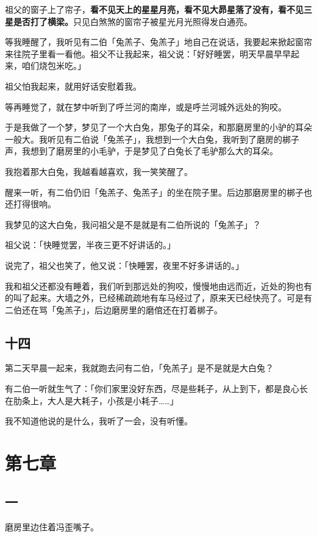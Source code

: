 \documentclass[UTF8]{ctexart}
\begin{document}
祖父的窗子上了帘子，\textbf{看不见天上的星星月亮，看不见大昴星落了没有，看不见三星是否打了横梁。}只见白煞煞的窗帘子被星光月光照得发白通亮。

等我睡醒了，我听见有二伯「兔羔子、兔羔子」地自己在说话，我要起来掀起窗帘来往院子里看一看他。祖父不让我起来，祖父说：「好好睡罢，明天早晨早早起来，咱们烧包米吃。」

祖父怕我起来，就用好话安慰着我。

等再睡觉了，就在梦中听到了呼兰河的南岸，或是呼兰河城外远处的狗咬。

于是我做了一个梦，梦见了一个大白兔，那兔子的耳朵，和那磨房里的小驴的耳朵一般大。我听见有二伯说「兔羔子」，我想到一个大白兔，我听到了磨房的梆子声，我想到了磨房里的小毛驴，于是梦见了白兔长了毛驴那么大的耳朵。

我抱着那大白兔，我越看越喜欢，我一笑笑醒了。

醒来一听，有二伯仍旧「兔羔子、兔羔子」的坐在院子里。后边那磨房里的梆子也还打得很响。

我梦见的这大白兔，我问祖父是不是就是有二伯所说的「兔羔子」？

祖父说：「快睡觉罢，半夜三更不好讲话的。」

说完了，祖父也笑了，他又说：「快睡罢，夜里不好多讲话的。」

我和祖父还都没有睡着，我们听到那远处的狗咬，慢慢地由远而近，近处的狗也有的叫了起来。大墙之外，已经稀疏疏地有车马经过了，原来天已经快亮了。可是有二伯还在骂「兔羔子」，后边磨房里的磨倌还在打着梆子。

\subsection{十四}

第二天早晨一起来，我就跑去问有二伯，「免羔子」是不是就是大白兔？

有二伯一听就生气了：「你们家里没好东西，尽是些耗子，从上到下，都是良心长在肋条上，大人是大耗子，小孩是小耗子……」

我不知道他说的是什么，我听了一会，没有听懂。

\section{第七章}

\subsection{一}

磨房里边住着冯歪嘴子。
\end{document}
